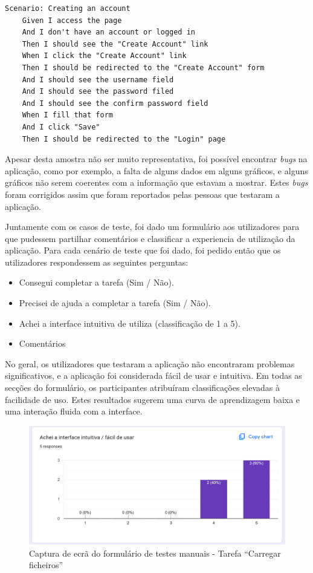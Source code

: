 \begin{lstlisting}[language=Gherkin, caption={Excerto do código \textit{Gherkin} do cenário de teste para a criação de uma conta}]
Scenario: Creating an account
	Given I access the page 
	And I don't have an account or logged in
	Then I should see the "Create Account" link
	When I click the "Create Account" link
	Then I should be redirected to the "Create Account" form
	And I should see the username field
	And I should see the password filed
	And I should see the confirm password field
	When I fill that form
	And I click "Save"
	Then I should be redirected to the "Login" page
\end{lstlisting}

Apesar desta amostra não ser muito representativa, foi possível encontrar \textit{bugs} na aplicação, como por exemplo, a falta de alguns dados em alguns gráficos, e alguns gráficos não serem coerentes com a informação que estavam a mostrar. Estes \textit{bugs} foram corrigidos assim que foram reportados pelas pessoas que testaram a aplicação.

Juntamente com os casos de teste, foi dado um formulário aos utilizadores para que pudessem partilhar comentários e classificar a experiencia de utilização da aplicação. Para cada cenário de teste que foi dado, foi pedido então que os utilizadores respondessem as seguintes perguntas:

\begin{itemize}
    \item Consegui completar a tarefa (Sim / Não).
    \item Precisei de ajuda a completar a tarefa (Sim / Não).
    \item Achei a interface intuitiva de utiliza (classificação de 1 a 5).
    \item Comentários
\end{itemize}



No geral, os utilizadores que testaram a aplicação não encontraram problemas significativos, e a aplicação foi considerada fácil de usar e intuitiva. Em todas as secções do formulário, os participantes atribuíram classificações elevadas à facilidade de uso. Estes resultados sugerem uma curva de aprendizagem baixa e uma interação fluida com a interface.

\begin{figure}[H]
\centering
\includegraphics[max width=\textwidth]{./img/form2}
\caption{Captura de ecrã do formulário de testes manuais - Tarefa ``Carregar ficheiros''}
\label{fig:form2}
\end{figure}

